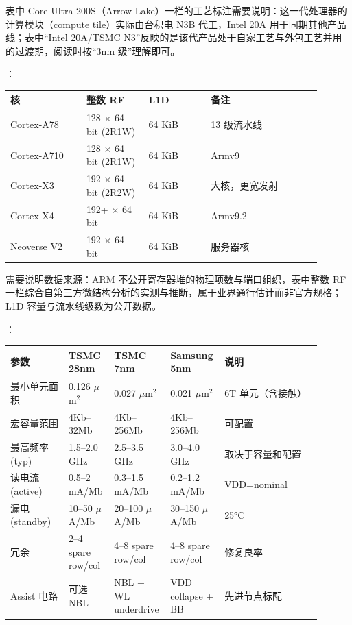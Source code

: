 表中 Core Ultra 200S（Arrow Lake）一栏的工艺标注需要说明：这一代处理器的计算模块（compute tile）实际由台积电 N3B 代工，Intel 20A 用于同期其他产品线；表中“Intel 20A/TSMC N3”反映的是该代产品处于自家工艺与外包工艺并用的过渡期，阅读时按“3nm 级”理解即可。

：

\begin{longtable}{L{0.22\linewidth}L{0.18\linewidth}L{0.18\linewidth}L{0.32\linewidth}}
\toprule
核 & 整数 RF & L1D & 备注 \\
\midrule
Cortex-A78 & 128 $\times$ 64 bit (2R1W) & 64 KiB & 13 级流水线 \\\tablerowrule
Cortex-A710 & 128 $\times$ 64 bit (2R1W) & 64 KiB & Armv9 \\\tablerowrule
Cortex-X3 & 192 $\times$ 64 bit (2R2W) & 64 KiB & 大核，更宽发射 \\\tablerowrule
Cortex-X4 & 192+ $\times$ 64 bit & 64 KiB & Armv9.2 \\\tablerowrule
Neoverse V2 & 192 $\times$ 64 bit & 64 KiB & 服务器核 \\
\bottomrule
\end{longtable}

需要说明数据来源：ARM 不公开寄存器堆的物理项数与端口组织，表中整数 RF 一栏综合自第三方微结构分析的实测与推断，属于业界通行估计而非官方规格；L1D 容量与流水线级数为公开数据。

：

\begin{longtable}{L{0.18\linewidth}L{0.14\linewidth}L{0.14\linewidth}L{0.14\linewidth}L{0.30\linewidth}}
\toprule
参数 & TSMC 28nm & TSMC 7nm & Samsung 5nm & 说明 \\
\midrule
最小单元面积 & 0.126 $\mu$m$^2$ & 0.027 $\mu$m$^2$ & 0.021 $\mu$m$^2$ & 6T 单元（含接触） \\\tablerowrule
宏容量范围 & 4Kb--32Mb & 4Kb--256Mb & 4Kb--256Mb & 可配置 \\\tablerowrule
最高频率 (typ) & 1.5--2.0 GHz & 2.5--3.5 GHz & 3.0--4.0 GHz & 取决于容量和配置 \\\tablerowrule
读电流 (active) & 0.5--2 mA/Mb & 0.3--1.5 mA/Mb & 0.2--1.2 mA/Mb & VDD=nominal \\\tablerowrule
漏电 (standby) & 10--50 $\mu$A/Mb & 20--100 $\mu$A/Mb & 30--150 $\mu$A/Mb & 25°C \\\tablerowrule
冗余 & 2--4 spare row/col & 4--8 spare row/col & 4--8 spare row/col & 修复良率 \\\tablerowrule
Assist 电路 & 可选 NBL & NBL + WL underdrive & VDD collapse + BB & 先进节点标配 \\
\bottomrule
\end{longtable}

